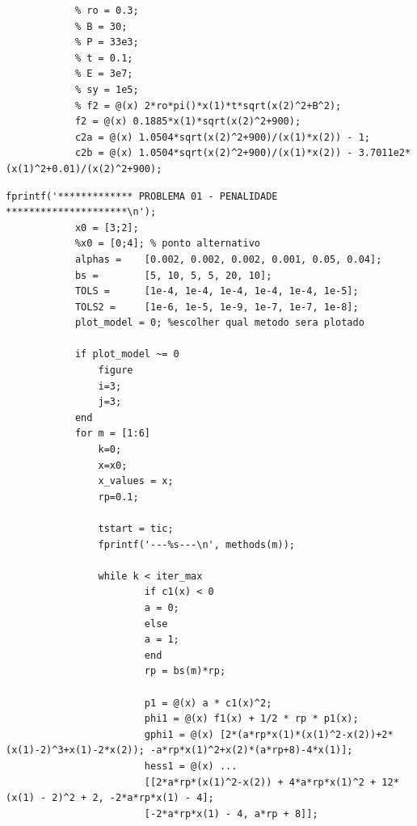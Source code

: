 \documentclass[10pt, a4paper]{article}
\begin{document}
\begin{minipage}{\linewidth}
      \begin{lstlisting}[style=myStyle, caption= defini\c c\~ao das fun\c c\~oes e restri\c c\~oes do problema 02, label=list_prob02]
            % dados do item 02
            % ro = 0.3;
            % B = 30;
            % P = 33e3;
            % t = 0.1;
            % E = 3e7;
            % sy = 1e5;
            % f2 = @(x) 2*ro*pi()*x(1)*t*sqrt(x(2)^2+B^2);
            f2 = @(x) 0.1885*x(1)*sqrt(x(2)^2+900);
            c2a = @(x) 1.0504*sqrt(x(2)^2+900)/(x(1)*x(2)) - 1;
            c2b = @(x) 1.0504*sqrt(x(2)^2+900)/(x(1)*x(2)) - 3.7011e2*(x(1)^2+0.01)/(x(2)^2+900);
      \end{lstlisting}
\end{minipage}

\begin{minipage}{\linewidth}
      \begin{lstlisting}[style=myStyle, caption= trecho de c\'odigo do problema 01 (penalidade), label=list_p01_pen]
            fprintf('************* PROBLEMA 01 - PENALIDADE *********************\n');
            x0 = [3;2];
            %x0 = [0;4]; % ponto alternativo
            alphas =    [0.002, 0.002, 0.002, 0.001, 0.05, 0.04];
            bs =        [5, 10, 5, 5, 20, 10];
            TOLS =      [1e-4, 1e-4, 1e-4, 1e-4, 1e-4, 1e-5];
            TOLS2 =     [1e-6, 1e-5, 1e-9, 1e-7, 1e-7, 1e-8];
            plot_model = 0; %escolher qual metodo sera plotado

            if plot_model ~= 0
                figure
                i=3;
                j=3;
            end
            for m = [1:6]
                k=0;
                x=x0;
                x_values = x;
                rp=0.1;

                tstart = tic;
                fprintf('---%s---\n', methods(m));

                while k < iter_max
                        if c1(x) < 0
                        a = 0;
                        else
                        a = 1;
                        end
                        rp = bs(m)*rp;

                        p1 = @(x) a * c1(x)^2;
                        phi1 = @(x) f1(x) + 1/2 * rp * p1(x);
                        gphi1 = @(x) [2*(a*rp*x(1)*(x(1)^2-x(2))+2*(x(1)-2)^3+x(1)-2*x(2)); -a*rp*x(1)^2+x(2)*(a*rp+8)-4*x(1)];
                        hess1 = @(x) ...
                        [[2*a*rp*(x(1)^2-x(2)) + 4*a*rp*x(1)^2 + 12*(x(1) - 2)^2 + 2, -2*a*rp*x(1) - 4];
                        [-2*a*rp*x(1) - 4, a*rp + 8]];


\end{lstlisting}
\end{minipage}
\end{document}
